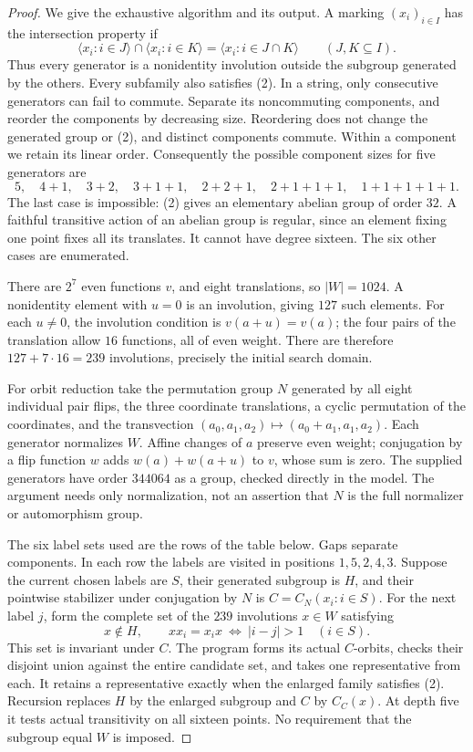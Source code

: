 \documentclass[11pt,a4paper]{article}
\newcommand{\gen}[1]{\langle #1\rangle}
\begin{document}
\begin{proof}
We give the exhaustive algorithm and its output. A marking
$(x_i)_{i\in I}$ has the intersection property if
\[
 \gen{x_i:i\in J}\cap\gen{x_i:i\in K}
              =\gen{x_i:i\in J\cap K}\qquad(J,K\subseteq I).
                                                        \tag{2}
\]
Thus every generator is a nonidentity involution outside the
subgroup generated by the others. Every subfamily also satisfies (2).
In a string, only consecutive generators can fail to commute.
Separate its noncommuting components, and reorder the components
by decreasing size. Reordering does not change the generated group
or (2), and distinct components commute. Within a component we
retain its linear order. Consequently the possible component sizes
for five generators are
\[
 5,\quad4+1,\quad3+2,\quad3+1+1,\quad2+2+1,\quad
 2+1+1+1,\quad1+1+1+1+1.                         \tag{3}
\]
The last case is impossible: (2) gives an elementary abelian group
of order $32$. A faithful transitive action of an abelian group is
regular, since an element fixing one point fixes all its translates.
It cannot have degree sixteen. The six other cases are enumerated.

There are $2^7$ even functions $v$, and eight translations, so
$|W|=1024$. A nonidentity element with $u=0$ is an involution,
giving $127$ such elements. For each $u\ne0$, the involution
condition is $v(a+u)=v(a)$; the four pairs of the translation allow
$16$ functions, all of even weight. There are therefore
$127+7\cdot16=239$ involutions, precisely the initial search domain.

For orbit reduction take the permutation group $N$ generated by
all eight individual pair flips, the three coordinate translations,
a cyclic permutation of the coordinates, and the transvection
$(a_0,a_1,a_2)\mapsto(a_0+a_1,a_1,a_2)$. Each generator normalizes
$W$. Affine changes of $a$ preserve even weight; conjugation by
a flip function $w$ adds $w(a)+w(a+u)$ to $v$, whose sum is zero.
The supplied generators have order $344064$ as a group, checked
directly in the model. The argument needs only normalization,
not an assertion that $N$ is the full normalizer or automorphism group.

The six label sets used are the rows of the table below. Gaps
separate components. In each row the labels are visited in positions
$1,5,2,4,3$. Suppose the current chosen labels are $S$, their
generated subgroup is $H$, and their pointwise stabilizer under
conjugation by $N$ is
$C=C_N(x_i:i\in S)$. For the next label $j$, form the complete
set of the $239$ involutions $x\in W$ satisfying
\[
 x\notin H,\qquad
 xx_i=x_ix\ \Longleftrightarrow\ |i-j|>1\quad(i\in S).       \tag{4}
\]
This set is invariant under $C$. The program forms its actual
$C$-orbits, checks their disjoint union against the entire candidate
set, and takes one representative from each. It retains a
representative exactly when the enlarged family satisfies (2).
Recursion replaces $H$ by the enlarged subgroup and $C$ by
$C_C(x)$. At depth five it tests actual transitivity on all sixteen
points. No requirement that the subgroup equal $W$ is imposed.


\end{proof}
\end{document}
